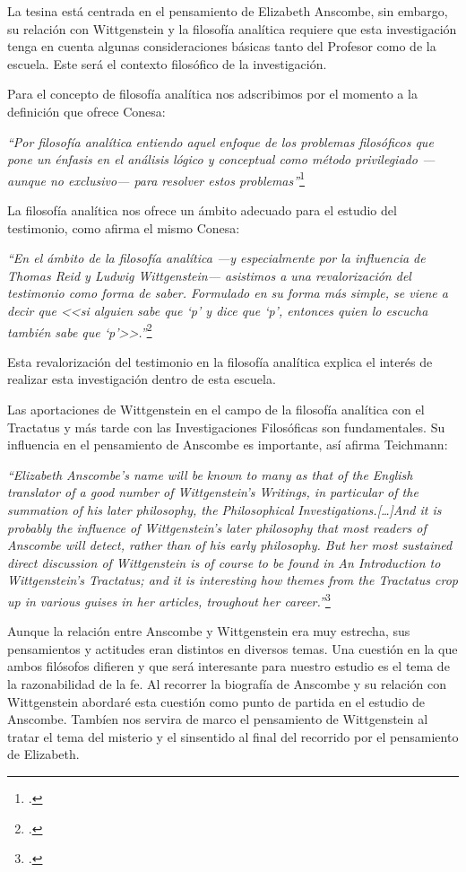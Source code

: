 \documentclass[../main.tex]{subfiles}
\begin{document}
La tesina está centrada en el pensamiento de Elizabeth Anscombe, sin embargo, su relación con Wittgenstein y la filosofía analítica requiere que esta investigación tenga en cuenta algunas consideraciones básicas tanto del Profesor como de la escuela. Este será el contexto filosófico de la investigación.

Para el concepto de filosofía analítica nos adscribimos por el momento a la definición que ofrece Conesa:

\emph{
``Por filosofía analítica entiendo aquel enfoque de los problemas filosóficos que pone un énfasis en el análisis lógico y conceptual como método privilegiado \mbox{---aunque} no \mbox{exclusivo---} para resolver estos problemas''}\footcite[16]{cyc}

La filosofía analítica nos ofrece un ámbito adecuado para el estudio del testimonio, como afirma el mismo Conesa:

\emph{
``En el ámbito de la filosofía analítica ---y especialmente por la influencia de Thomas Reid y Ludwig Wittgenstein--- asistimos a una revalorización del testimonio como forma de saber. Formulado en su forma más simple, se viene a decir que <<si alguien sabe que `p' y dice que `p', entonces quien lo escucha también sabe que `p'>>.''}\footcite[487]{feylogicaconesa}

Esta revalorización del testimonio en la filosofía analítica explica el interés de realizar esta investigación dentro de esta escuela. 

Las aportaciones de Wittgenstein en el campo de la filosofía analítica con el Tractatus y más tarde con las Investigaciones Filosóficas son fundamentales. Su influencia en el pensamiento de Anscombe es importante, así afirma Teichmann:

\emph{
``Elizabeth Anscombe's name will be known to many as that of the English translator of a good number of Wittgenstein's Writings, in particular of the summation of his later philosophy, the Philosophical Investigations.[\ldots]And it is probably the influence of Wittgenstein's later philosophy that most readers of Anscombe will detect, rather than of his early philosophy. But her most sustained direct discussion of Wittgenstein is of course to be found in An Introduction to Wittgenstein's Tractatus; and it is interesting how themes from the Tractatus crop up in various guises in her articles, troughout her career.''}\footcite[191]{teichmann}

Aunque la relación entre Anscombe y Wittgenstein era muy estrecha, sus pensamientos y actitudes eran distintos en diversos temas. Una cuestión en la que ambos filósofos difieren y que será interesante para nuestro estudio es el tema de la razonabilidad de la fe. Al recorrer la biografía de Anscombe y su relación con Wittgenstein abordaré esta cuestión como punto de partida en el estudio de Anscombe. Tambíen nos servira de marco el pensamiento de Wittgenstein al tratar el tema del misterio y el sinsentido al final del recorrido por el pensamiento de Elizabeth.
\end{document}
